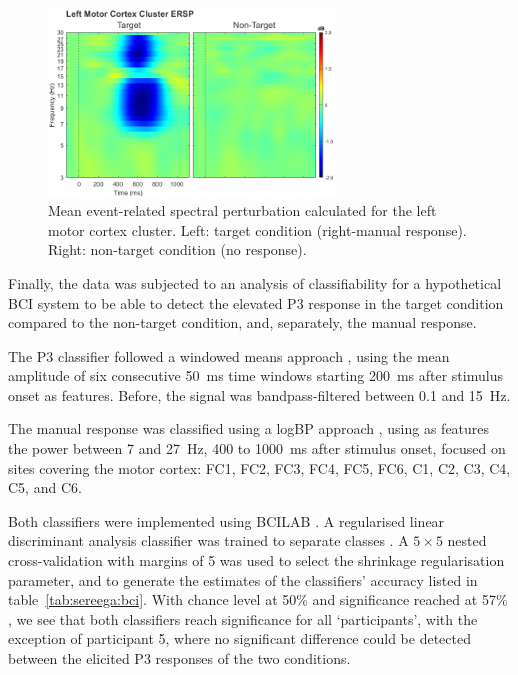 \begin{figure}
    \centering
    \includegraphics[width=3in]{figures/sereega-mcersp.png}
    \caption[Mean event-related spectral perturbation calculated for the simulated left motor cortex cluster.]{Mean event-related spectral perturbation calculated for the left motor cortex cluster. Left: target condition (right-manual response). Right: non-target condition (no response).}
    \label{fig:sereega:mcersp}
\end{figure}

Finally, the data was subjected to an analysis of classifiability for a hypothetical BCI system to be able to detect the elevated P3 response in the target condition compared to the non-target condition, and, separately, the manual response.

The P3 classifier followed a windowed means approach \cite{blankertz2011}, using the mean amplitude of six consecutive 50~ms time windows starting 200~ms after stimulus onset as features. Before, the signal was bandpass-filtered between 0.1 and 15~Hz. 

The manual response was classified using a logBP approach \cite{pfurtscheller2001motorimagery}, using as features the power between 7 and 27~Hz, 400 to 1000~ms after stimulus onset, focused on sites covering the motor cortex: FC1, FC2, FC3, FC4, FC5, FC6,  C1, C2, C3, C4, C5, and C6.

Both classifiers were implemented using BCILAB \cite{kothe2013bcilab}. A regularised linear discriminant analysis classifier was trained to separate classes \cite{duda2001}. A $5\times5$ nested cross-validation with margins of 5 was used to select the shrinkage regularisation parameter, and to generate the estimates of the classifiers' accuracy listed in table~\ref{tab:sereega:bci}. With chance level at 50\% and significance reached at 57\% \cite{mullerputz2008random}, we see that both classifiers reach significance for all `participants', with the exception of participant 5, where no significant difference could be detected between the elicited P3 responses of the two conditions.

